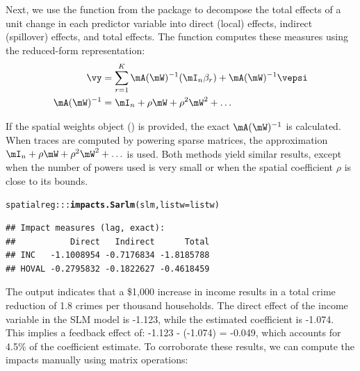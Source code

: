 \documentclass[english,12pt]{book}\usepackage[]{graphicx}\usepackage[]{xcolor}
\makeatletter
\newcommand{\hlopt}[1]{\textcolor[rgb]{0,0,0}{#1}}%
\newcommand{\hldef}[1]{\textcolor[rgb]{0.345,0.345,0.345}{#1}}%
\newcommand{\hlkwc}[1]{\textcolor[rgb]{0.333,0.667,0.333}{#1}}%
\newcommand{\hlkwd}[1]{\textcolor[rgb]{0.737,0.353,0.396}{\textbf{#1}}}%
\newenvironment{kframe}{%
 \def\at@end@of@kframe{}%
 \ifinner\ifhmode%
  \def\at@end@of@kframe{\end{minipage}}%
  \begin{minipage}{\columnwidth}%
 \fi\fi%
 \def\FrameCommand##1{\hskip\@totalleftmargin \hskip-\fboxsep
 \colorbox{shadecolor}{##1}\hskip-\fboxsep
     \hskip-\linewidth \hskip-\@totalleftmargin \hskip\columnwidth}%
 \MakeFramed {\advance\hsize-\width
   \@totalleftmargin\z@ \linewidth\hsize
   \@setminipage}}%
 {\par\unskip\endMakeFramed%
 \at@end@of@kframe}
\newenvironment{knitrout}{}{} %
\makeatother
\begin{document}
Next, we use the  function from the  package to decompose the total effects of a unit change in each predictor variable into direct (local) effects, indirect (spillover) effects, and total effects. The  function computes these measures using the reduced-form representation:
\begin{equation*}
  \begin{aligned}
    \vy & = \sum_{r = 1}^K \mA(\mW)^{-1}(\mI_n\beta_r) + \mA(\mW)^{-1}\vepsi \\
     \mA(\mW)^{-1} & = \mI_n + \rho\mW + \rho^2\mW^2 + \ldots
  \end{aligned}
\end{equation*}

If the spatial weights object () is provided, the exact $\mA(\mW)^{-1}$ is calculated. When traces are computed by powering sparse matrices, the approximation $\mI_n + \rho\mW + \rho^2\mW^2 + \ldots$ is used. Both methods yield similar results, except when the number of powers used is very small or when the spatial coefficient $\rho$ is close to its bounds.

\begin{knitrout}
\color{fgcolor}\begin{kframe}
\begin{alltt}
\hldef{spatialreg}\hlopt{:::}\hlkwd{impacts.Sarlm}\hldef{(slm,} \hlkwc{listw} \hldef{= listw)}
\end{alltt}
\begin{verbatim}
## Impact measures (lag, exact):
##           Direct   Indirect      Total
## INC   -1.1008954 -0.7176834 -1.8185788
## HOVAL -0.2795832 -0.1822627 -0.4618459
\end{verbatim}
\end{kframe}
\end{knitrout}

The output indicates that a \$1,000 increase in income results in a total crime reduction of 1.8 crimes per thousand households. The direct effect of the income variable in the SLM model is -1.123, while the estimated coefficient is -1.074. This implies a feedback effect of: -1.123 - (-1.074) = -0.049, which accounts for 4.5\% of the coefficient estimate. To corroborate these results, we can compute the impacts manually using matrix operations:
\end{document}
